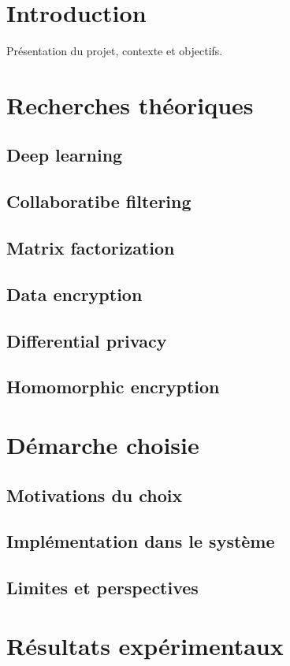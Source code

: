 \documentclass{article}
\begin{document}
\tableofcontents
\newpage

\section*{Introduction}
Présentation du projet, contexte et objectifs.

\section{Recherches théoriques}
\subsection{Deep learning}
\subsection{Collaboratibe filtering}
\subsection{Matrix factorization}
\subsection{Data encryption}
\subsection{Differential privacy}
\subsection{Homomorphic encryption}


\section{Démarche choisie}
\subsection{Motivations du choix}
\subsection{Implémentation dans le système}
\subsection{Limites et perspectives}


\section{Résultats expérimentaux}
\end{document}
